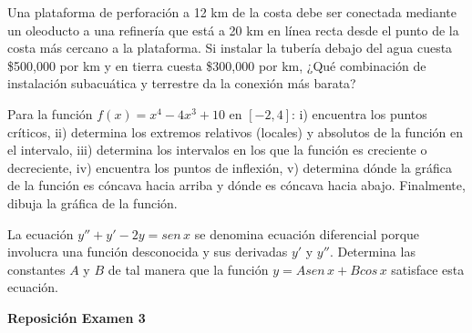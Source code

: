 \documentclass[12pt]{exam}
\begin{document}
\begin{questions}
    \question Una plataforma de perforación a 12 km de la costa debe ser conectada mediante un oleoducto a una refinería que está a 20 km en línea recta desde el punto de la costa más cercano a la plataforma. Si instalar la tubería debajo del agua cuesta \$500,000 por km y en tierra cuesta \$300,000 por km, ¿Qué combinación de instalación subacuática y terrestre da la conexión más barata?

\vskip10pt
\question Para la función $f(x)=x^4-4x^3+10$ en $[-2,4]$: i) encuentra los puntos críticos, ii) determina los extremos relativos (locales) y absolutos de la función en el intervalo, iii) determina los intervalos en los que la función es creciente o decreciente, iv) encuentra los puntos de inflexión, v) determina dónde la gráfica de la función es cóncava hacia arriba y dónde es cóncava hacia abajo. Finalmente, dibuja la gráfica de la función.

\question La ecuación $y''+y'-2y=sen\,x$ se denomina ecuación diferencial porque involucra una función desconocida y sus derivadas $y'$ y $y''$. Determina las constantes $A$ y $B$ de tal manera que la función $y=Asen\,x+Bcos\,x$ satisface esta ecuación.

    \end{questions}


\newpage

\begin{center}
\Large 
\textbf{Reposición Examen 3}
\end{center}{}
\normalsize
\end{document}
